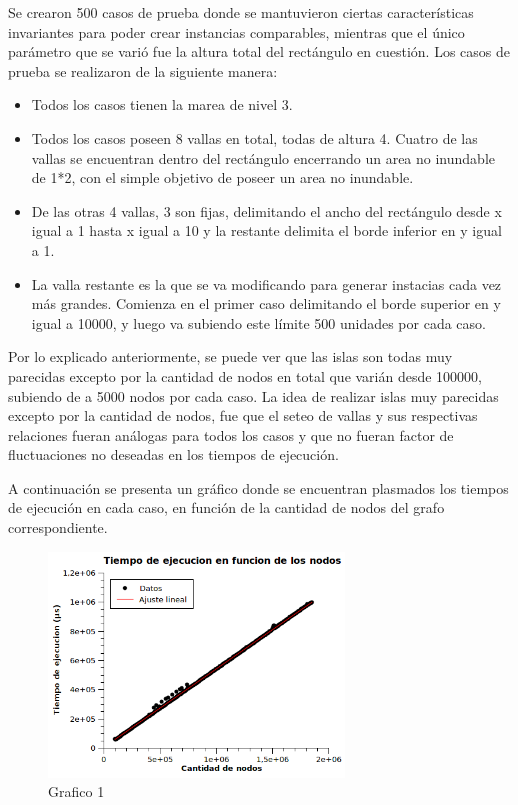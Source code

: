 \documentclass[a4paper, 12pt]{article}
\begin{document}
Se crearon 500 casos de prueba donde se mantuvieron ciertas caracter\'isticas invariantes para poder crear instancias comparables, mientras que el \'unico par\'ametro que se vari\'o fue la altura total del rect\'angulo en cuesti\'on.
Los casos de prueba se realizaron de la siguiente manera:
\begin{itemize}
\item Todos los casos tienen la marea de nivel 3.
\item Todos los casos poseen 8 vallas en total, todas de altura 4. Cuatro de las vallas se encuentran dentro del rect\'angulo encerrando un area no inundable de 1*2, con el simple objetivo de poseer un area no inundable.
\item De las otras 4 vallas, 3 son fijas, delimitando el ancho del rect\'angulo desde x igual a 1 hasta x igual a 10 y la restante delimita el borde inferior en y igual a 1.
\item La valla restante es la que se va modificando para generar instacias cada vez m\'as grandes. Comienza en el primer caso delimitando el borde superior en y igual a 10000, y luego va subiendo este l\'imite 500 unidades por cada caso.
\end{itemize}

Por lo explicado anteriormente, se puede ver que las islas son todas muy parecidas excepto por la cantidad de nodos en total que vari\'an desde 100000, subiendo de a 5000 nodos por cada caso. La idea de realizar islas muy parecidas excepto por la cantidad de nodos, fue que el seteo de vallas y sus respectivas relaciones fueran an\'alogas para todos los casos y que no fueran factor de fluctuaciones no deseadas en los tiempos de ejecuci\'on.

A continuaci\'on se presenta un gr\'afico donde se encuentran plasmados los tiempos de ejecuci\'on en cada caso, en funci\'on de la cantidad de nodos del grafo correspondiente.

\begin{figure}[H]
\centering
\includegraphics[width=0.7\textwidth]{imagenes/Resultados2.png} 
\caption{Grafico 1}
\end{figure}
\end{document}
